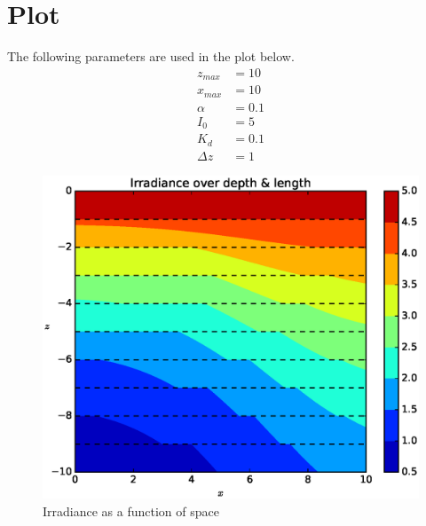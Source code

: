 \documentclass{article}
\begin{document}
\section{Plot}
The following parameters are used in the plot below.
\begin{align*}
	z_{max} &= 10 \\
	x_{max} &= 10 \\
	\alpha &= 0.1 \\
	I_0&=5 \\
	K_d &= 0.1 \\
	\Delta z &= 1
\end{align*}

\vspace{-2em}
\begin{figure}[H]
	\centering
	\includegraphics[width=6in]{normal_length.eps}
	\caption{Irradiance as a function of space}
\end{figure}
\end{document}
